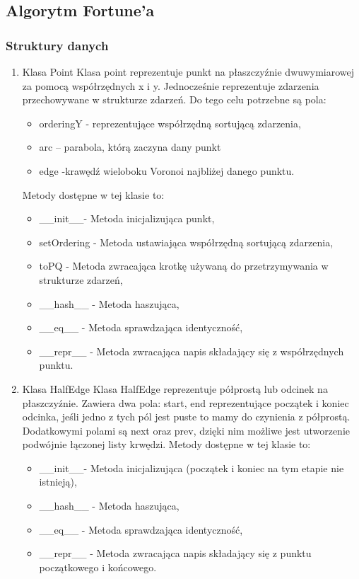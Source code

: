 \documentclass{article}
\begin{document}
\subsection{Algorytm Fortune'a}
\subsubsection{Struktury danych}
\begin{enumerate}
    \item Klasa Point 
    \newline
    \newline
    Klasa point reprezentuje punkt na płaszczyźnie dwuwymiarowej za pomocą współrzędnych x i y. Jednocześnie reprezentuje zdarzenia przechowywane w strukturze zdarzeń. Do tego celu potrzebne są pola:
    \begin{itemize}
        \item orderingY - reprezentujące współrzędną sortującą zdarzenia,
        \item arc – parabola, którą zaczyna dany punkt
        \item edge -krawędź wieloboku Voronoi najbliżej danego punktu.
    \end{itemize}
    Metody dostępne w tej klasie to:
    \begin{itemize}
        \item \_\_init\_\_- Metoda inicjalizująca punkt,
        \item setOrdering - Metoda ustawiająca współrzędną sortującą zdarzenia,
        \item toPQ - Metoda zwracająca krotkę używaną do przetrzymywania w strukturze zdarzeń,
        \item\_\_hash\_\_ - Metoda haszująca,
        \item \_\_eq\_\_ - Metoda sprawdzająca identyczność,
        \item \_\_repr\_\_ - Metoda zwracająca napis składający się z współrzędnych punktu.
    \end{itemize}
    
    \item Klasa HalfEdge 
    \newline
    \newline
    Klasa HalfEdge reprezentuje półprostą lub odcinek na płaszczyźnie. Zawiera dwa pola: start, end reprezentujące początek i koniec odcinka, jeśli jedno z tych pól jest puste to mamy do czynienia z półprostą. Dodatkowymi polami są next oraz prev, dzięki nim możliwe jest utworzenie podwójnie łączonej listy krwędzi.
    \newline
    Metody dostępne w tej klasie to:
    \begin{itemize}
        \item \_\_init\_\_- Metoda inicjalizująca (początek i koniec na tym etapie nie istnieją),
        \item\_\_hash\_\_ - Metoda haszująca,
        \item \_\_eq\_\_ - Metoda sprawdzająca identyczność,
        \item \_\_repr\_\_ - Metoda zwracająca napis składający się z punktu początkowego i końcowego.
    \end{itemize}
    

\end{enumerate}
\end{document}
